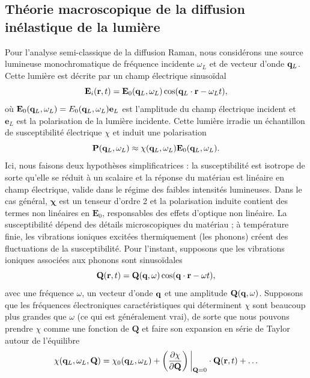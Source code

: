 \subsection{Théorie macroscopique de la diffusion inélastique de la lumière}
Pour l'analyse semi-classique de la diffusion Raman, nous considérons une source lumineuse monochromatique de fréquence incidente $\omega_L$ et de vecteur d'onde $\mathbf{q}_L$. Cette lumière est décrite par un champ électrique sinusoïdal
\begin{equation}
    \mathbf{E}_i(\mathbf{r},t) = \mathbf{E}_0(\mathbf{q}_L,\omega_L)\cos(\mathbf{q}_L\cdot\mathbf{r}-\omega_L t),
\end{equation}
où $\mathbf{E}_0(\mathbf{q}_L, \omega_L)=E_0(\mathbf{q}_L,\omega_L)\mathbf{e}_L$ est l'amplitude du champ électrique incident et $\mathbf{e}_L$ est la polarisation de la lumière incidente. Cette lumière irradie un échantillon de susceptibilité électrique $\chi$ et induit une polarisation
\begin{equation}
    \mathbf{P}(\mathbf{q}_L,\omega_L) \approx \chi(\mathbf{q}_L,\omega_L)\mathbf{E}_0(\mathbf{q}_L,\omega_L).\label{eqn:P_ind}
\end{equation}
Ici, nous faisons deux hypothèses simplificatrices : la susceptibilité est isotrope de sorte qu'elle se réduit à un scalaire et la réponse du matériau est linéaire en champ électrique, valide dans le régime des faibles intensités lumineuses. Dans le cas général, $\bm{\chi}$ est un tenseur d'ordre 2 et la polarisation induite contient des termes non linéaires en $\mathbf{E}_0$, responsables des effets d'optique non linéaire. La susceptibilité dépend des détails microscopiques du matériau ; à température finie, les vibrations ioniques excitées thermiquement (les phonons) créent des fluctuations de la susceptibilité. Pour l'instant, supposons que les vibrations ioniques associées aux phonons sont sinusoïdales
\begin{equation}
    \mathbf{Q}(\mathbf{r},t)=\mathbf{Q}(\mathbf{q}, \omega)\cos(\mathbf{q}\cdot\mathbf{r}-\omega t),\label{eqn:Q}
\end{equation}
avec une fréquence $\omega$, un vecteur d'onde $\mathbf{q}$ et une amplitude $\mathbf{Q}(\mathbf{q},\omega)$. Supposons que les fréquences électroniques caractéristiques qui déterminent $\chi$ sont beaucoup plus grandes que $\omega$ (ce qui est généralement vrai), de sorte que nous pouvons prendre $\chi$ comme une fonction de $\mathbf{Q}$ et faire son expansion en série de Taylor autour de l'équilibre
\begin{equation}
    \chi(\qv_L,\omega_L,\mathbf{Q}) = \chi_0(\qv_L,\omega_L) + \left(\frac{\partial \chi}{\partial \mathbf{Q}}\right)\bigg\rvert_{\mathbf{Q}=0}\cdot\mathbf{Q}(\rv,t)+\dots\label{eqn:chi_exp}
\end{equation}
